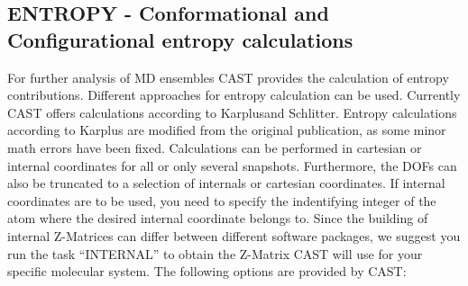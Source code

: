 \documentclass[10pt,a4paper]{article} %
\begin{document}
	\subsection{ENTROPY - Conformational and Configurational entropy calculations}
	For further analysis of \acl{MD} ensembles \ac{CAST} provides the calculation of entropy contributions. Different approaches for entropy calculation can be used. Currently \ac{CAST} offers calculations according to Karplus\supercite{karplus_entropy}and Schlitter\supercite{schlitter_entropy}. Entropy calculations according to Karplus are modified from the original publication, as some minor math errors have been fixed. Calculations can be performed in cartesian or internal coordinates for all or only several snapshots. Furthermore, the \acp{DOF} can also be truncated to a selection of internals or cartesian coordinates. If internal coordinates are to be used, you need to specify the indentifying integer of the atom where the desired internal coordinate belongs to. Since the building of internal Z-Matrices can differ between different software packages, we suggest you run the task ``INTERNAL'' to obtain the Z-Matrix \ac{CAST} will use for your specific molecular system. The following options are provided by \ac{CAST}: \\~\\
	
\end{document}

